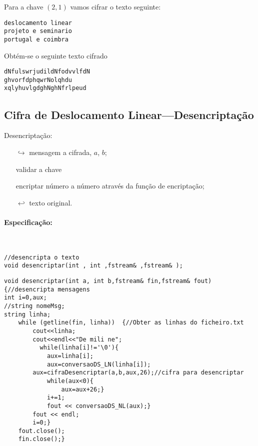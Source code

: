 Para a chave $(2,1)$ vamos cifrar o texto seguinte:
\begin{verbatim}
deslocamento linear
projeto e seminario
portugal e coimbra
\end{verbatim}
Obtém-se o seguinte texto cifrado
\begin{verbatim}
dNfulswrjudildNfodvvlfdN
ghvorfdphqwrNolqhdu
xqlyhuvlgdghNghNfrlpeud
\end{verbatim}

\subsection{Cifra de Deslocamento Linear---Desencriptação}
\label{sec:cdlDesencriptacao}

Desencriptação:
\begin{itemize}
    \item[$\hookrightarrow$] mensagem a cifrada, $a$, $b$;
    \item[] validar a chave
    \item[] encriptar número a número através da função de encriptação;
    \item[$\hookleftarrow$] texto original.
\end{itemize}

\paragraph{Especificação:} {\ }

\begin{lstlisting}[frame=single,mathescape=true,caption={Cifra de Deslocamento Linear---Especificação de \texttt{cifraDesencriptar}},captionpos=b,label={lst:DeslocamentoSimplesDesencriptar},basicstyle=\footnotesize]
//desencripta o texto
void desencriptar(int , int ,fstream& ,fstream& );
\end{lstlisting}

\begin{lstlisting}[frame=single,mathescape=true,caption={Desencriptação},captionpos=b,label={lst:Desencriptação},basicstyle=\footnotesize]
void desencriptar(int a, int b,fstream& fin,fstream& fout){//desencripta mensagens
int i=0,aux;
//string nomeMsg;
string linha;
    while (getline(fin, linha))  {//Obter as linhas do ficheiro.txt
        cout<<linha;
        cout<<endl<<"De mili ne";
          while(linha[i]!='\0'){
            aux=linha[i];
            aux=conversaoDS_LN(linha[i]);
        aux=cifraDesencriptar(a,b,aux,26);//cifra para desencriptar
            while(aux<0){
                aux=aux+26;}
            i+=1;
            fout << conversaoDS_NL(aux);}
        fout << endl;
        i=0;}
    fout.close();
    fin.close();}
\end{lstlisting}

